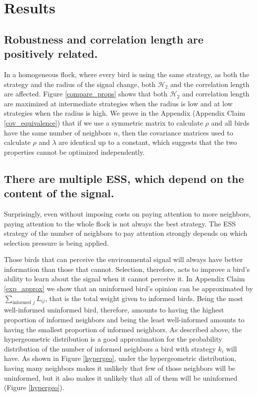 \documentclass{article}
\begin{document}
\section{Results }

\subsection{Robustness and correlation length are positively related. }
In a homogeneous flock, where every bird is using the same strategy, as both the strategy and the radius of the signal change, both $\mathscr{H}_2$ and the correlation length are affected.  Figure \ref{compare_props} shows that both $\mathscr{H}_2$ and correlation length are maximized at intermediate strategies when the radius is low and at low strategies when the radius is high. We prove in the Appendix (Appendix Claim \ref{cov_equivalence}) that if we use a symmetric matrix to calculate $\rho$ and all birds have the same number of neighbors $n$, then the covariance matrices used to calculate $\rho$ and $\lambda$ are identical up to a constant, which suggests that the two properties cannot be optimized independently.

\subsection{There are multiple ESS, which depend on the content of the signal. }
Surprisingly, even without imposing costs on paying attention to more neighbors, paying attention to the whole flock is not always the best strategy. The ESS strategy of the number of neighbors to pay attention strongly depends on which selection pressure is being applied.  

Those birds that can perceive the environmental signal will always have better information than those that cannot. Selection, therefore, acts to improve a bird's ability to learn about the signal when it cannot perceive it.  In Appendix Claim \ref{exp_approx} we show that an uninformed bird's opinion can be approximated by $\sum_{\text{informed }j}L_{ij}$, that is the total weight given to informed birds.  Being the most well-informed uninformed bird, therefore, amounts to having the highest proportion of informed neighbors and being the least well-informed amounts to having the smallest proportion of informed neighbors. As described above, the hypergeometric distribution is a good approximation for the probability distribution of the number of informed neighbors a bird with strategy $k_i$ will have. As shown in Figure \ref{hypergeo}, under the hypergeometric distribution, having many neighbors makes it unlikely that few of those neighbors will be uninformed, but it also makes it unlikely that all of them will be uninformed (Figure \ref{hypergeo}).  
\end{document}
